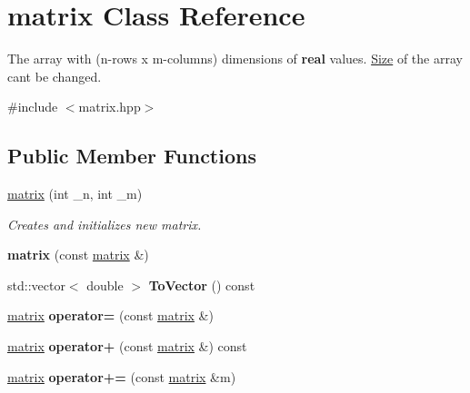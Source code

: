 \hypertarget{classmatrix}{}\section{matrix Class Reference}
\label{classmatrix}


The array with (n-\/rows x m-\/columns) dimensions of {\bfseries real} values. \mbox{\hyperlink{struct_size}{Size}} of the array can\textquotesingle{}t be changed.  




{\ttfamily \#include $<$matrix.\+hpp$>$}

\subsection*{Public Member Functions}
\begin{DoxyCompactItemize}
\item 
\mbox{\label{classmatrix_add3506596457db2aa2b913bb9c364e31}} 
\mbox{\hyperlink{classmatrix_add3506596457db2aa2b913bb9c364e31}{matrix}} (int \+\_\+n, int \+\_\+m)
\begin{DoxyCompactList}\small\item\em Creates and initializes new matrix. \end{DoxyCompactList}\item 
\mbox{\label{classmatrix_a4018e1b43d9ce6fe0fe385e796b4ff9d}} 
{\bfseries matrix} (const \mbox{\hyperlink{classmatrix}{matrix}} \&)
\item 
\mbox{\label{classmatrix_afe4d1e17fbbda7e391801eafbc951996}} 
std\+::vector$<$ double $>$ {\bfseries To\+Vector} () const
\item 
\mbox{\label{classmatrix_aa18ddf4f504206635586e48d7c2fbb68}} 
\mbox{\hyperlink{classmatrix}{matrix}} {\bfseries operator=} (const \mbox{\hyperlink{classmatrix}{matrix}} \&)
\item 
\mbox{\label{classmatrix_a3ead8a54609a914a2b963a656d110282}} 
\mbox{\hyperlink{classmatrix}{matrix}} {\bfseries operator+} (const \mbox{\hyperlink{classmatrix}{matrix}} \&) const
\item 
\mbox{\label{classmatrix_a241b7864981d7886dd74f64e52cebbd0}} 
\mbox{\hyperlink{classmatrix}{matrix}} {\bfseries operator+=} (const \mbox{\hyperlink{classmatrix}{matrix}} \&m)

\end{DoxyCompactItemize}

